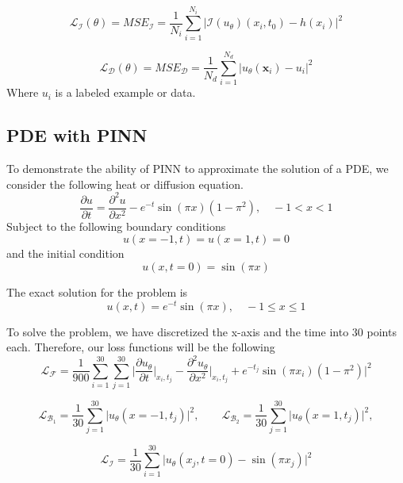 \documentclass[a4paper, onecolumn, 12pt]{article}
\begin{document}
\begin{equation}
\mathcal{L}_{\mathcal{I}}(\theta) = MSE_{\mathcal{I}} 
= \frac{1}{N_i} \sum_{i=1}^{N_i} \bigg| \mathcal{I}(u_\theta)(x_i, t_0) - h(x_i) \bigg|^2
\end{equation}

\begin{equation}
\mathcal{L}_{\mathcal{D}}(\theta) = MSE_{\mathcal{D}} 
= \frac{1}{N_d} \sum_{i=1}^{N_d} \bigg| u_{\theta}(\mathbf{x}_i) - u_i \bigg|^2
\end{equation}
Where $u_i$ is a labeled example or data.

\subsection{PDE with PINN}
To demonstrate the ability of PINN to approximate the solution of a PDE, we 
consider the following heat or diffusion equation.
\begin{equation}
\frac{\partial u}{\partial t} = \frac{\partial^2 u}{\partial x^2}
- e^{-t} \sin{(\pi x)} (1 - \pi^2), \quad -1 < x < 1
\end{equation} 
Subject to the following boundary conditions
\begin{equation}
    u(x=-1, t) = u(x=1, t) = 0
\end{equation}
and the initial condition
\begin{equation}
u(x, t=0) = \sin(\pi x)
\end{equation}

The exact solution for the problem is 
\begin{equation}
u(x, t) = e^{-t} \sin(\pi x), \quad -1 \le x \le 1
\end{equation}

To solve the problem, we have discretized the x-axis and the time into $30$ points each.
Therefore, our loss functions will be the following
$$
\mathcal{L}_{\mathcal{F}} = \frac{1}{900} \sum_{i=1}^{30} \sum_{j=1}^{30} 
\Bigg| 
\frac{\partial u_\theta}{\partial t}\bigg|_{x_i, t_j} - \frac{\partial^2 u_\theta}{\partial x^2}\bigg|_{x_i, t_j}
+ e^{-t_j} \sin{(\pi x_i)} (1 - \pi^2) 
\Bigg|^2
$$

$$
\mathcal{L}_{\mathcal{B}_1} = \frac{1}{30} \sum_{j=1}^{30} 
\Bigg| u_\theta(x=-1, t_j) \Bigg|^2, \qquad
\mathcal{L}_{\mathcal{B}_2} = \frac{1}{30} \sum_{j=1}^{30} 
\Bigg| u_\theta(x=1, t_j) \Bigg|^2,
$$

$$
\mathcal{L}_{\mathcal{I}} = \frac{1}{30} \sum_{i=1}^{30}
\Bigg| u_\theta(x_j, t=0) - \sin(\pi x_j) \Bigg|^2
$$
\end{document}
